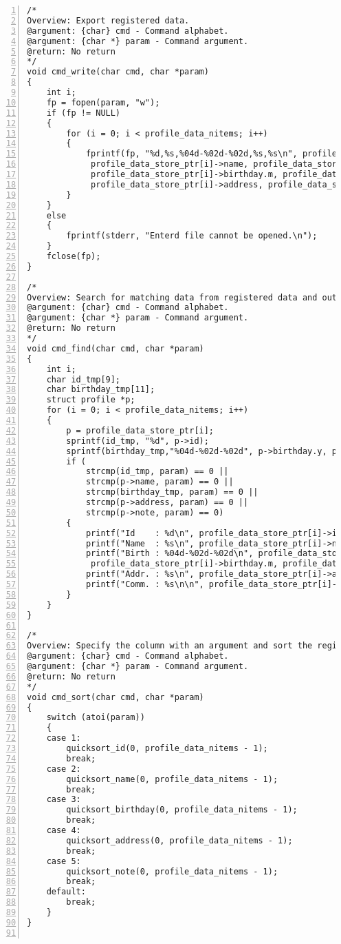 \documentclass[autodetect-engine,dvi=dvipdfmx,ja=standard,
               a4j,11pt]{bxjsarticle}
\begin{document}
\begin{Verbatim}[numbers=left, xleftmargin=10mm, numbersep=6pt,
    fontsize=\small, baselinestretch=0.8]
/*
Overview: Export registered data.
@argument: {char} cmd - Command alphabet.
@argument: {char *} param - Command argument.
@return: No return
*/
void cmd_write(char cmd, char *param)
{
    int i;
    fp = fopen(param, "w");
    if (fp != NULL)
    {
        for (i = 0; i < profile_data_nitems; i++)
        {
            fprintf(fp, "%d,%s,%04d-%02d-%02d,%s,%s\n", profile_data_store_ptr[i]->id,
             profile_data_store_ptr[i]->name, profile_data_store_ptr[i]->birthday.y,
             profile_data_store_ptr[i]->birthday.m, profile_data_store_ptr[i]->birthday.d,
             profile_data_store_ptr[i]->address, profile_data_store_ptr[i]->note);
        }
    }
    else
    {
        fprintf(stderr, "Enterd file cannot be opened.\n");
    }
    fclose(fp);
}

/*
Overview: Search for matching data from registered data and output.
@argument: {char} cmd - Command alphabet.
@argument: {char *} param - Command argument.
@return: No return
*/
void cmd_find(char cmd, char *param)
{
    int i;
    char id_tmp[9];
    char birthday_tmp[11];
    struct profile *p;
    for (i = 0; i < profile_data_nitems; i++)
    {
        p = profile_data_store_ptr[i];
        sprintf(id_tmp, "%d", p->id);
        sprintf(birthday_tmp,"%04d-%02d-%02d", p->birthday.y, p->birthday.m, p->birthday.d);
        if (
            strcmp(id_tmp, param) == 0 ||
            strcmp(p->name, param) == 0 ||
            strcmp(birthday_tmp, param) == 0 ||
            strcmp(p->address, param) == 0 ||
            strcmp(p->note, param) == 0)
        {
            printf("Id    : %d\n", profile_data_store_ptr[i]->id);
            printf("Name  : %s\n", profile_data_store_ptr[i]->name);
            printf("Birth : %04d-%02d-%02d\n", profile_data_store_ptr[i]->birthday.y,
             profile_data_store_ptr[i]->birthday.m, profile_data_store_ptr[i]->birthday.d);
            printf("Addr. : %s\n", profile_data_store_ptr[i]->address);
            printf("Comm. : %s\n\n", profile_data_store_ptr[i]->note);
        }
    }
}

/*
Overview: Specify the column with an argument and sort the registered data.
@argument: {char} cmd - Command alphabet.
@argument: {char *} param - Command argument.
@return: No return
*/
void cmd_sort(char cmd, char *param)
{
    switch (atoi(param))
    {
    case 1:
        quicksort_id(0, profile_data_nitems - 1);
        break;
    case 2:
        quicksort_name(0, profile_data_nitems - 1);
        break;
    case 3:
        quicksort_birthday(0, profile_data_nitems - 1);
        break;
    case 4:
        quicksort_address(0, profile_data_nitems - 1);
        break;
    case 5:
        quicksort_note(0, profile_data_nitems - 1);
        break;
    default:
        break;
    }
}


\end{Verbatim}
\end{document}
